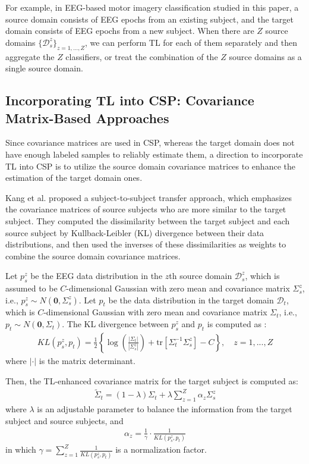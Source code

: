 \documentclass[runningheads]{llncs}
\begin{document}
For example, in EEG-based motor imagery classification studied in this paper, a source domain consists of EEG epochs from an existing subject, and the target domain consists of EEG epochs from a new subject. When there are $Z$ source domains $\{\mathcal{D}_s^z\}_{z=1,...,Z}$, we can perform TL for each of them separately and then aggregate the $Z$ classifiers, or treat the combination of the $Z$ source domains as a single source domain.

\subsection{Incorporating TL into CSP: Covariance Matrix-Based Approaches} \label{sect:CM}

Since covariance matrices are used in CSP, whereas the target domain does not have enough labeled samples to reliably estimate them, a direction to incorporate TL into CSP is to utilize the source domain covariance matrices to enhance the estimation of the target domain ones.

Kang et al. \cite{Kang2009} proposed a subject-to-subject transfer approach, which emphasizes the covariance matrices of source subjects who are more similar to the target subject. They computed the dissimilarity between the target subject and each source subject by Kullback-Leibler (KL) divergence between their data distributions, and then used the inverses of these dissimilarities as weights to combine the source domain covariance matrices.

Let $p_s^z$ be the EEG data distribution in the $z$th source domain $\mathcal{D}_s^z$, which is assumed to be $C$-dimensional Gaussian with zero mean and covariance matrix $\Sigma_s^z$, i.e., $p_s^z\sim N(\mathbf{0},\Sigma_s^z)$. Let $p_t$ be the data distribution in the target domain $\mathcal{D}_t$, which is $C$-dimensional Gaussian with zero mean and covariance matrix $\Sigma_t$, i.e., $p_t\sim N(\mathbf{0},\Sigma_t)$. The KL divergence between $p_s^z$ and $p_t$ is computed as \cite{Kang2009}:
\begin{align}
KL(p_s^z,p_t)=\frac{1}{2}\left\{\log\left(\frac{|\Sigma_t|}{|\Sigma_s^z|}\right)
+\mathrm{tr}[\Sigma_t^{-1}\Sigma_s^z]-C\right\},\quad z=1,...,Z \label{8}
\end{align}
where $|\cdot|$ is the matrix determinant.

Then, the TL-enhanced covariance matrix for the target subject is computed as:
\begin{align}
\widetilde{\Sigma}_t=(1-\lambda)\Sigma_t+\lambda\sum_{z=1}^Z\alpha_z\Sigma_s^z \label{10}
\end{align}
where $\lambda$ is an adjustable parameter to balance the information from the target subject and source subjects, and
\begin{align}
 \alpha_z=\frac{1}{\gamma}\cdot\frac{1}{KL(p_s^z,p_t)} \label{9}
\end{align}
in which $\gamma=\sum_{z=1}^Z\frac{1}{KL(p_s^z,p_t)}$ is a normalization factor.
\end{document}

